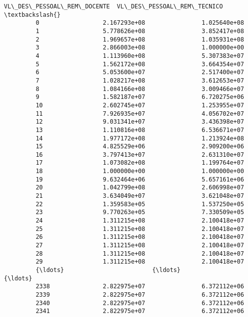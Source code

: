 \documentclass[11pt]{article}
\begin{document}
\begin{Verbatim}[commandchars=\\\{\}]
              VL\_DES\_PESSOAL\_REM\_DOCENTE  VL\_DES\_PESSOAL\_REM\_TECNICO  \textbackslash{}
         0                  2.167293e+08                1.025640e+08   
         1                  5.778626e+08                3.852417e+08   
         2                  1.969657e+08                1.035931e+08   
         3                  2.866003e+08                1.000000e+00   
         4                  1.113960e+08                5.307383e+07   
         5                  1.562172e+08                3.664354e+07   
         6                  5.053600e+07                2.517400e+07   
         7                  1.028217e+08                3.612653e+07   
         8                  1.084166e+08                3.009466e+07   
         9                  1.582187e+07                6.720275e+06   
         10                 2.602745e+07                1.253955e+07   
         11                 7.926935e+07                4.056702e+07   
         12                 9.031341e+07                3.436398e+07   
         13                 1.110816e+08                6.536671e+07   
         14                 1.977172e+08                1.213924e+08   
         15                 4.825529e+06                2.909200e+06   
         16                 3.797413e+07                2.631310e+07   
         17                 1.073082e+08                1.199764e+07   
         18                 1.000000e+00                1.000000e+00   
         19                 9.632464e+06                5.657161e+06   
         20                 1.042799e+08                2.606998e+07   
         21                 3.634049e+07                3.621048e+07   
         22                 1.359583e+05                1.537250e+05   
         23                 9.770263e+05                7.330509e+05   
         24                 1.311215e+08                2.100418e+07   
         25                 1.311215e+08                2.100418e+07   
         26                 1.311215e+08                2.100418e+07   
         27                 1.311215e+08                2.100418e+07   
         28                 1.311215e+08                2.100418e+07   
         29                 1.311215e+08                2.100418e+07   
         {\ldots}                         {\ldots}                         {\ldots}   
         2338               2.822975e+07                6.372112e+06   
         2339               2.822975e+07                6.372112e+06   
         2340               2.822975e+07                6.372112e+06   
         2341               2.822975e+07                6.372112e+06   

\end{Verbatim}
\end{document}
